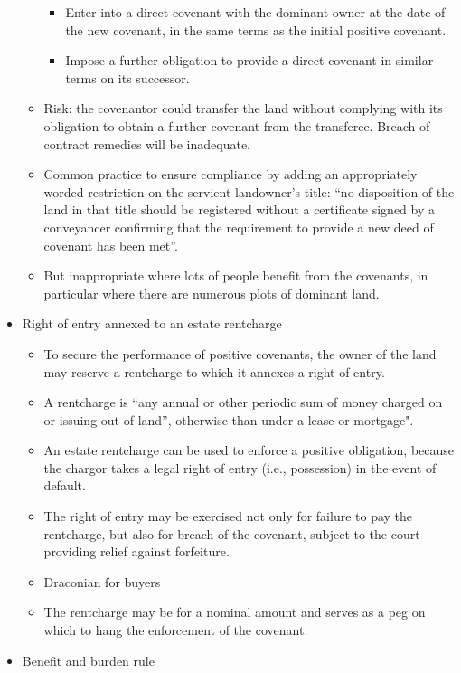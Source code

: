 \documentclass[
]{article}
\providecommand{\tightlist}{%
  \setlength{\itemsep}{0pt}\setlength{\parskip}{0pt}}
\begin{document}
\begin{itemize}
\begin{itemize}
    \begin{itemize}
    \tightlist
    \item
      Enter into a direct covenant with the dominant owner at the date
      of the new covenant, in the same terms as the initial positive
      covenant.
    \item
      Impose a further obligation to provide a direct covenant in
      similar terms on its successor.
    \end{itemize}
  \item
    Risk: the covenantor could transfer the land without complying with
    its obligation to obtain a further covenant from the transferee.
    Breach of contract remedies will be inadequate.
  \item
    Common practice to ensure compliance by adding an appropriately
    worded restriction on the servient landowner's title: ``no
    disposition of the land in that title should be registered without a
    certificate signed by a conveyancer confirming that the requirement
    to provide a new deed of covenant has been met''.
  \item
    But inappropriate where lots of people benefit from the covenants,
    in particular where there are numerous plots of dominant land.
  \end{itemize}
\item
  Right of entry annexed to an estate rentcharge

  \begin{itemize}
  \tightlist
  \item
    To secure the performance of positive covenants, the owner of the
    land may reserve a rentcharge to which it annexes a right of entry.
  \item
    A rentcharge is ``any annual or other periodic sum of money charged
    on or issuing out of land'', otherwise than under a lease or
    mortgage".
  \item
    An estate rentcharge can be used to enforce a positive obligation,
    because the chargor takes a legal right of entry (i.e., possession)
    in the event of default.
  \item
    The right of entry may be exercised not only for failure to pay the
    rentcharge, but also for breach of the covenant, subject to the
    court providing relief against forfeiture.
  \item
    Draconian for buyers
  \item
    The rentcharge may be for a nominal amount and serves as a peg on
    which to hang the enforcement of the covenant.
  \end{itemize}
\item
  Benefit and burden rule


\end{itemize}
\end{document}
